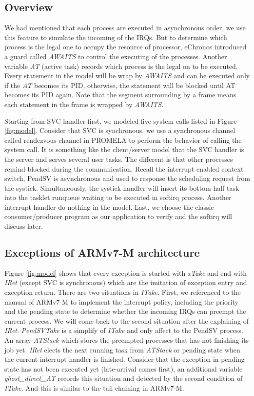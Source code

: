 \subsection{Overview}
We had mentioned that each process are executed in asynchronous order, we use this feature to simulate the incoming of the IRQs. But to determine which process is the legal one to occupy the resource of processor, eChronos introduced a guard called \textit{AWAITS} to control the executing of the processes. Another variable \textit{AT} (active task) records which process is the legal on to be executed. Every statement in the model will be wrap by \textit{AWAITS} and can be executed only if the \textit{AT} becomes its PID, otherwise, the statement will be blocked until AT becomes its PID again. Note that the segment surrounding by a frame means each statement in the frame is wrapped by \textit{AWAITS}.

Starting from SVC handler first, we modeled five system calls listed in Figure \ref{fig:model}. Consider that SVC is synchronous, we use a synchronous channel called rendezvous channel in PROMELA to perform the behavior of calling the system call. It is something like the client/server model that the SVC handler is the server and serves several user tasks. The different is that other processes remind blocked during the communication. Recall the interrupt enabled context switch, PendSV is asynchronous and used to response the scheduling request from the systick. Simultaneously, the systick handler will insert its bottom half task into the tasklet runqueue waiting to be executed in softirq process. Another interrupt handler do nothing in the model. Last, we choose the classic consumer/producer program as our application to verify and the softirq will discuss later.

\subsection{Exceptions of ARMv7-M architecture}
Figure \ref{fig:model} shows that every exception is started with \textit{xTake} and end with \textit{IRet} (except SVC is synchronous) which are the imitation of exception entry and exception return. There are two situations in \textit{ITake}. First, we referenced to the manual of ARMv7-M to implement the interrupt policy, including the priority and the pending state to determine whether the incoming IRQs can preempt the current process. We will come back to the second situation after the explaining of \textit{IRet}. \textit{PendSVTake} is a simplify of \textit{ITake} and only affect to the PendSV process. An array \textit{ATStack} which stores the preempted processes that has not finishing its job yet. \textit{IRet} elects the next running task from \textit{ATStack} or pending state when the current interrupt handler is finished. Consider that the exception in pending state has not been executed yet (late-arrival comes first), an additional variable \textit{ghost\_direct\_AT} records this situation and detected by the second condition of \textit{ITake}. And this is similar to the tail-chaining in ARMv7-M.

